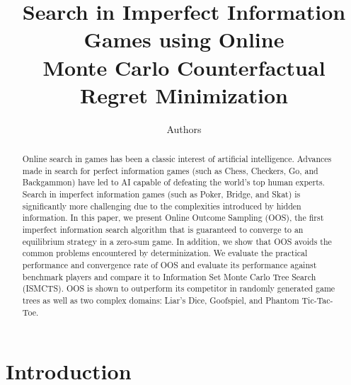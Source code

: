 \documentclass[letterpaper]{article}
\begin{document}
%
\title{Search in Imperfect Information Games using Online\\Monte Carlo Counterfactual Regret Minimization}
\author{Authors}


\maketitle

\begin{abstract}
Online search in games has been a classic interest of artificial intelligence.
Advances made in search for perfect information games (such as Chess, Checkers, Go, and Backgammon) have led to AI capable of defeating 
the world's top human experts. 
Search in imperfect information games (such as Poker, Bridge, and Skat) is significantly more challenging 
due to the complexities introduced by hidden information. 
In this paper, we present Online Outcome Sampling (OOS), the first imperfect information search algorithm that is guaranteed to
converge to an equilibrium strategy in a zero-sum game.   
In addition, we show that OOS avoids the common problems encountered by determinization.
We evaluate the practical performance and convergence rate of OOS and evaluate its performance against benchmark players and compare 
it to Information Set Monte Carlo Tree Search (ISMCTS). 
OOS is shown to outperform its competitor in randomly generated game trees as well as two complex domains: Liar's Dice, Goofspiel, and 
Phantom Tic-Tac-Toe. 
\end{abstract}

\section{Introduction}

\end{document}
